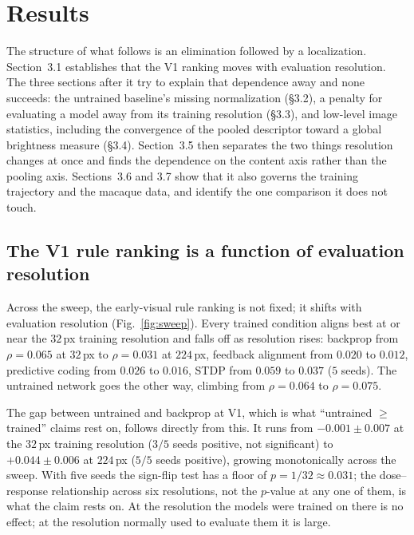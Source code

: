 \documentclass[10pt,twocolumn]{article}
\begin{document}
\section{Results}

The structure of what follows is an elimination followed by a localization. Section~3.1 establishes that the V1 ranking moves with evaluation resolution. The three sections after it try to explain that dependence away and none succeeds: the untrained baseline's missing normalization (\S3.2), a penalty for evaluating a model away from its training resolution (\S3.3), and low-level image statistics, including the convergence of the pooled descriptor toward a global brightness measure (\S3.4). Section~3.5 then separates the two things resolution changes at once and finds the dependence on the content axis rather than the pooling axis. Sections~3.6 and 3.7 show that it also governs the training trajectory and the macaque data, and identify the one comparison it does not touch.

\subsection{The V1 rule ranking is a function of evaluation resolution}

Across the sweep, the early-visual rule ranking is not fixed; it shifts with evaluation resolution (Fig.~\ref{fig:sweep}). Every trained condition aligns best at or near the $32$\,px training resolution and falls off as resolution rises: backprop from $\rho=0.065$ at $32$\,px to $\rho=0.031$ at $224$\,px, feedback alignment from $0.020$ to $0.012$, predictive coding from $0.026$ to $0.016$, STDP from $0.059$ to $0.037$ ($5$ seeds). The untrained network goes the other way, climbing from $\rho=0.064$ to $\rho=0.075$.

The gap between untrained and backprop at V1, which is what ``untrained $\geq$ trained'' claims rest on, follows directly from this. It runs from $-0.001 \pm 0.007$ at the $32$\,px training resolution ($3/5$ seeds positive, not significant) to $+0.044 \pm 0.006$ at $224$\,px ($5/5$ seeds positive), growing monotonically across the sweep. With five seeds the sign-flip test has a floor of $p = 1/32 \approx 0.031$; the dose--response relationship across six resolutions, not the $p$-value at any one of them, is what the claim rests on. At the resolution the models were trained on there is no effect; at the resolution normally used to evaluate them it is large.
\end{document}
